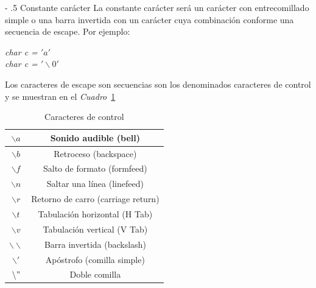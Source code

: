 \documentclass[a4paper,10pt]{article}
\makeatletter
\renewcommand\paragraph{%
   \@startsection{paragraph}{4}{0mm}%
      {-\baselineskip}%
      {.5\baselineskip}%
      {\normalfont\normalsize\bfseries}}
\makeatother
\begin{document}
\paragraph{Constante carácter}
La constante carácter será un carácter con entrecomillado simple o una barra invertida con un carácter cuya combinación conforme una secuencia de escape. Por ejemplo:\\

\begin{center}
	\emph{char c = $'a'$}\\
	\emph{char c = $'\backslash 0'$}
\end{center}

\noindent Los caracteres de escape son secuencias son los denominados caracteres de control y se muestran en el \emph{Cuadro}~\ref{tab:escape}
\begin{table}[htp!]
\centering
\begin{tabular}{|c|c|}         
\hline
$\backslash a$&Sonido audible (bell)\\ \hline
$\backslash b$&Retroceso (backspace)\\ \hline
$\backslash f$ &Salto de formato (formfeed)\\ \hline
$\backslash n$&Saltar una línea (linefeed)\\ \hline
$\backslash r$&Retorno de carro (carriage return)\\ \hline
$\backslash t$&Tabulación horizontal (H Tab)\\ \hline
$\backslash v$&Tabulación vertical (V Tab)\\ \hline
$\backslash \backslash$&Barra invertida (backslash)\\ \hline
$\backslash '$&Apóstrofo (comilla simple)\\ \hline
$\backslash "$&Doble comilla\\ \hline
\end{tabular}
\caption{Caracteres de control}
\label{tab:escape}
\end{table}
\end{document}
